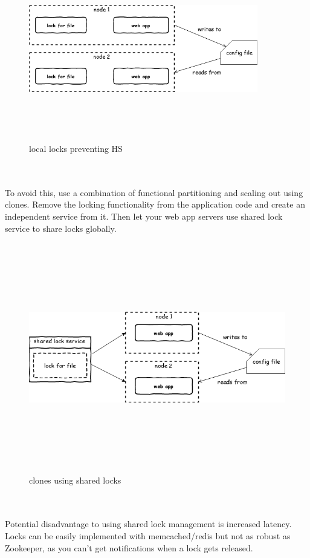 \begin{figure}[h!]
  \centering
  \includegraphics[width=10cm,height=8cm,keepaspectratio]{../media/crawler/wrng-local-locks.png}
  \caption{local locks preventing HS}
  \label{fig:wrnglocks}
\end{figure}
\\
\\
\noindent
To avoid this, use a combination of functional partitioning and scaling out using
clones. Remove the locking functionality from the application code and create an
independent service from it. Then let your web app servers use shared lock service
to share locks globally.
\begin{figure}[h!]
  \centering
  \includegraphics[width=13cm,height=10cm,keepaspectratio]{../media/crawler/rght-shared-locks.png}
  \caption{clones using shared locks}
  \label{fig:rghtlocks}
\end{figure}
\\
\\
\noindent
Potential disadvantage to using shared lock management is increased latency. Locks
can be easily implemented with memcached/redis but not as robust as Zookeeper, as
you can't get notifications when a lock gets released.